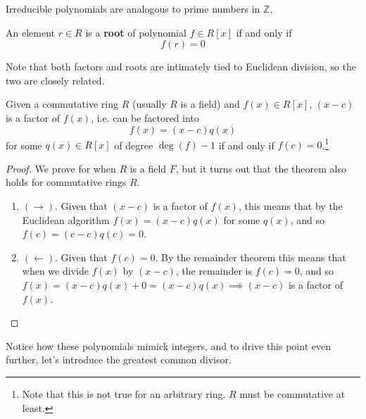   Irreducible polynomials are analogous to prime numbers in $\mathbb{Z}$. 

  \begin{definition}
    An element $r \in R$ is a \textbf{root} of polynomial $f \in R[x]$ if and only if 
    \begin{equation}
      f(r) = 0
    \end{equation}
  \end{definition} 

  Note that both factors and roots are intimately tied to Euclidean division, so the two are closely related. 

  \begin{theorem}
    Given a commutative ring $R$ (usually $R$ is a field) and $f(x) \in R[x]$, $(x - c)$ is a factor of $f(x)$, i.e. can be factored into 
    \begin{equation}
      f(x) = (x - c) q(x) 
    \end{equation}
    for some $q(x) \in R[x]$ of degree $\deg(f) - 1$ if and only if $f(c) = 0$.\footnote{Note that this is not true for an arbitrary ring. $R$ must be commutative at least.}
  \end{theorem} 
  \begin{proof}
    We prove for when $R$ is a field $F$, but it turns out that the theorem also holds for commutative rings $R$. 
    \begin{enumerate}
      \item $(\rightarrow)$. Given that $(x - c)$ is a factor of $f(x)$, this means that by the Euclidean algorithm $f(x) = (x - c) q(x)$ for some $q(x)$, and so $f(c) = (c - c) q(c) = 0$. 
      \item $(\leftarrow)$. Given that $f(c) = 0$. By the remainder theorem this means that when we divide $f(x)$ by $(x - c)$, the remainder is $f(c) = 0$, and so $f(x) = (x - c) q(x) + 0 = (x - c) q(x) \implies (x - c)$ is a factor of $f(x)$. 
    \end{enumerate}
  \end{proof}

  Notice how these polynomials mimick integers, and to drive this point even further, let's introduce the greatest common divisor. 

